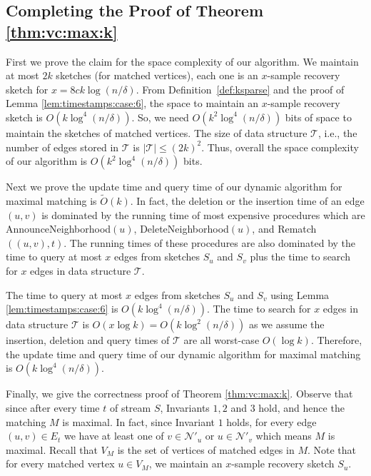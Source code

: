 \documentclass[11pt,letter]{article}
\begin{document}
\subsection{Completing the Proof of Theorem \ref{thm:vc:max:k}}

First we prove the claim for the space complexity of our algorithm.
We maintain at most $2k$ sketches (for matched vertices), each one is
an $x$-sample recovery sketch for $x=8ck\log(n/\delta)$.
From Definition~\ref{def:ksparse} and the proof of Lemma
\ref{lem:timestamps:case:6}, the space to maintain an
$x$-sample recovery sketch is $O(k\log^4(n/\delta))$. So, we need
$O(k^2\log^4(n/\delta))$ bits of space to maintain the sketches of matched vertices.
The size of data structure $\mathcal{T}$, i.e.,
the number of edges stored in $\mathcal{T}$ is $|\mathcal{T}|\le (2k)^2$.
Thus, overall the space complexity of our algorithm is $O(k^2\log^4(n/\delta))$ bits.

Next we prove the update time and query time of our dynamic algorithm
for maximal matching is $\tilde{O}(k)$. In fact, the deletion or the insertion
time of an edge $(u,v)$ is dominated by the running time of most expensive
procedures which are {\sf AnnounceNeighborhood$(u)$}, {\sf DeleteNeighborhood$(u)$},
and {\sf Rematch$((u,v),t)$}. The running times of these procedures are also
dominated by the time to query at most $x$ edges from sketches $S_u$ and $S_v$ plus
the time to search for $x$ edges in data structure $\mathcal{T}$.

The time to query at most $x$ edges from sketches $S_u$ and $S_v$ using
Lemma \ref{lem:timestamps:case:6} is $O(k\log^4(n/\delta))$. The time to search
for $x$ edges in data structure $\mathcal{T}$ is $O(x\log k)=O(k\log^2(n/\delta))$ as we assume
the insertion, deletion and query times of $\mathcal{T}$ are all worst-case $O(\log k)$.
Therefore, the update time and query time of our dynamic algorithm
for maximal matching is $O(k\log^4(n/\delta))$.

Finally, we give the correctness proof of Theorem \ref{thm:vc:max:k}.
Observe that since after every time $t$ of stream $S$, Invariants $1,2$ and $3$ hold, and hence the matching $M$
is maximal. In fact, since Invariant $1$ holds,  for every edge $(u,v)\in E_t$
we have at least one of $v\in \mathcal{N}'_u$ or $u\in \mathcal{N}'_v$
which means $M$ is maximal.
Recall that $V_M$ is the set of vertices of matched edges in $M$.
Note that for every matched vertex $u\in V_M$,
we maintain an $x$-sample recovery sketch $S_u$.
\end{document}
